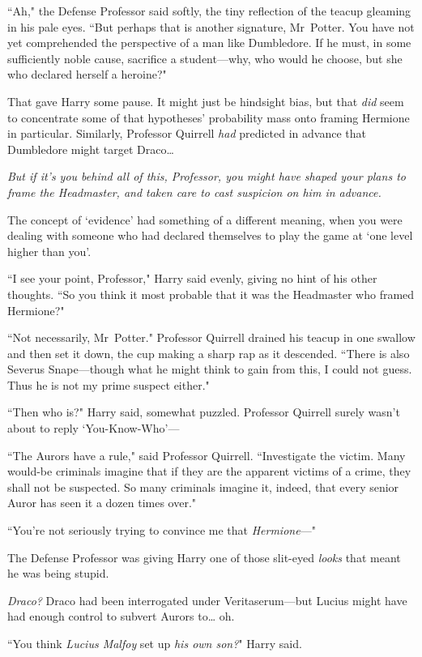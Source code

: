 ``Ah," the Defense Professor said softly, the tiny reflection of the teacup gleaming in his pale eyes. ``But perhaps that is another signature, Mr~Potter. You have not yet comprehended the perspective of a man like Dumbledore. If he must, in some sufficiently noble cause, sacrifice a student—why, who would he choose, but she who declared herself a heroine?"

That gave Harry some pause. It might just be hindsight bias, but that \emph{did} seem to concentrate some of that hypotheses' probability mass onto framing Hermione in particular. Similarly, Professor Quirrell \emph{had} predicted in advance that Dumbledore might target Draco{\ldots}

\emph{But if it's you behind all of this, Professor, you might have shaped your plans to frame the Headmaster, and taken care to cast suspicion on him in advance.}

The concept of `evidence' had something of a different meaning, when you were dealing with someone who had declared themselves to play the game at `one level higher than you'.

``I see your point, Professor," Harry said evenly, giving no hint of his other thoughts. ``So you think it most probable that it was the Headmaster who framed Hermione?"

``Not necessarily, Mr~Potter." Professor Quirrell drained his teacup in one swallow and then set it down, the cup making a sharp rap as it descended. ``There is also Severus Snape—though what he might think to gain from this, I could not guess. Thus he is not my prime suspect either."

``Then who is?" Harry said, somewhat puzzled. Professor Quirrell surely wasn't about to reply `You-Know-Who'—

``The Aurors have a rule," said Professor Quirrell. ``Investigate the victim. Many would-be criminals imagine that if they are the apparent victims of a crime, they shall not be suspected. So many criminals imagine it, indeed, that every senior Auror has seen it a dozen times over."

``You're not seriously trying to convince me that \emph{Hermione}—"

The Defense Professor was giving Harry one of those slit-eyed \emph{looks} that meant he was being stupid.

\emph{Draco?} Draco had been interrogated under Veritaserum—but Lucius might have had enough control to subvert Aurors to{\ldots} oh.

``You think \emph{Lucius Malfoy} set up \emph{his own son?}" Harry said.

